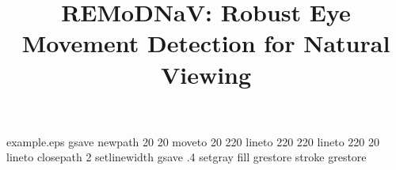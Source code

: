 %
%
%
%
%
\begin{filecontents*}{example.eps}
    gsave
    newpath
    20 20 moveto
    20 220 lineto
    220 220 lineto
    220 20 lineto
    closepath
    2 setlinewidth
    gsave
    .4 setgray fill
    grestore
    stroke
    grestore
\end{filecontents*}
%
\RequirePackage{fix-cm}
%
\documentclass[smallextended,twocolumn]{svjour3}          %
%
\smartqed  %
%
\usepackage{graphicx}
%
%
\usepackage{natbib}


\usepackage{amsmath}
\usepackage{booktabs}
\usepackage{units}
\usepackage[draft]{hyperref} %
\usepackage{wrapfig}
\usepackage{todonotes}
\newcommand{\eg}{e.g., }
\newcommand{\remodnav}{REMoDNaV }





\onecolumn
\title{REMoDNaV: Robust Eye Movement Detection for Natural Viewing } %


